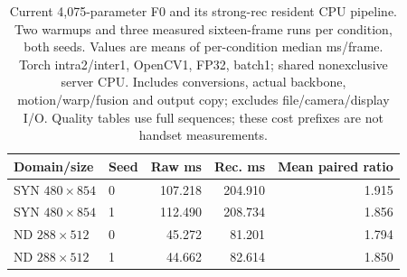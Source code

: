\begin{table}[t]
\centering\small
\caption{Current 4,075-parameter F0 and its strong-rec resident CPU pipeline. Two warmups and three measured sixteen-frame runs per condition, both seeds. Values are means of per-condition median ms/frame. Torch intra2/inter1, OpenCV1, FP32, batch1; shared nonexclusive server CPU. Includes conversions, actual backbone, motion/warp/fusion and output copy; excludes file/camera/display I/O. Quality tables use full sequences; these cost prefixes are not handset measurements.}
\label{tab:current-baseline-cpu}
\begin{tabular}{llrrr}
\toprule
Domain/size & Seed & Raw ms & Rec. ms & Mean paired ratio\\
\midrule
SYN $480\times854$ & 0 & 107.218 & 204.910 & 1.915\\
SYN $480\times854$ & 1 & 112.490 & 208.734 & 1.856\\
ND $288\times512$ & 0 & 45.272 & 81.201 & 1.794\\
ND $288\times512$ & 1 & 44.662 & 82.614 & 1.850\\
\bottomrule
\end{tabular}
\end{table}

